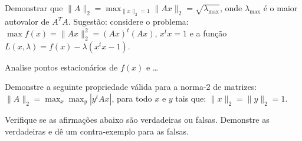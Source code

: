 \documentclass[a4paper,12pt, leqno, answers]{exam}
\begin{document}
\begin{questions}

    \question Demonstrar que $\| A \|_2 = \max_{\| x \|_2 = 1} \| A x \|_2 = \sqrt{\lambda_\text{max}}$, onde $\lambda_\text{max}$ \'{e} o maior autovalor de $A^T A$. Sugest\~{a}o: considere o problema: $\max f(x) = \| A x \|_2^2 = \left( A x \right)^t \left( A x \right)$, $x^t x = 1$ e a fun\c{c}\~{a}o $L(x, \lambda) = f(x) - \lambda \left( x^t x - 1 \right)$.
    \begin{solution}
        
    \end{solution}

    Analise pontos estacion\'{a}rios de $f(x)$ e \dots
    \begin{solution}
        
    \end{solution}

    \question Demonstre a seguinte propriedade v\'{a}lida para a norma-2 de matrizes: $\| A \|_2 = \max_x \max_y | y^t A x |$, para todo $x$ e $y$ tais que: $\| x \|_2 = \| y \|_2 = 1$.
    \begin{solution}
        
    \end{solution}

    \question Verifique se as afirma\c{c}\~{o}es abaixo s\~{a}o verdadeiras ou falsas. Demonstre as verdadeiras e d\^{e} um contra-exemplo para as falsas.
\end{questions}
\end{document}
